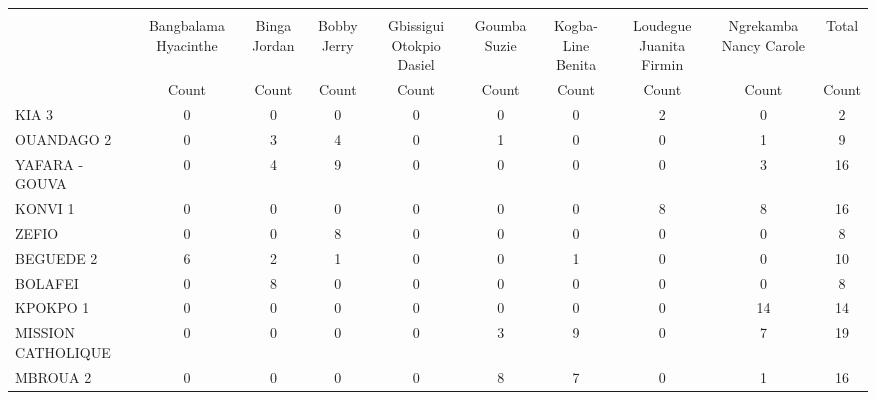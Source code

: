 {
\def\sym#1{\ifmmode^{#1}\else\(^{#1}\)\fi}
\begin{tabular}{l*{9}{c}}
\hline\hline
            &\multicolumn{9}{c}{}                                                                                                                           \\
            &Bangbalama Hyacinthe&   Binga Jordan&    Bobby Jerry&Gbissigui Otokpio Dasiel&   Goumba Suzie&Kogba-Line Benita&Loudegue Juanita Firmin&Ngrekamba Nancy Carole&          Total\\
            &          Count&          Count&          Count&          Count&          Count&          Count&          Count&          Count&          Count\\
\hline
KIA 3       &              0&              0&              0&              0&              0&              0&              2&              0&              2\\
OUANDAGO  2 &              0&              3&              4&              0&              1&              0&              0&              1&              9\\
YAFARA - GOUVA&              0&              4&              9&              0&              0&              0&              0&              3&             16\\
KONVI 1     &              0&              0&              0&              0&              0&              0&              8&              8&             16\\
ZEFIO       &              0&              0&              8&              0&              0&              0&              0&              0&              8\\
BEGUEDE   2 &              6&              2&              1&              0&              0&              1&              0&              0&             10\\
BOLAFEI     &              0&              8&              0&              0&              0&              0&              0&              0&              8\\
KPOKPO    1 &              0&              0&              0&              0&              0&              0&              0&             14&             14\\
MISSION  CATHOLIQUE&              0&              0&              0&              0&              3&              9&              0&              7&             19\\
MBROUA 2    &              0&              0&              0&              0&              8&              7&              0&              1&             16\\

\end{tabular}}
